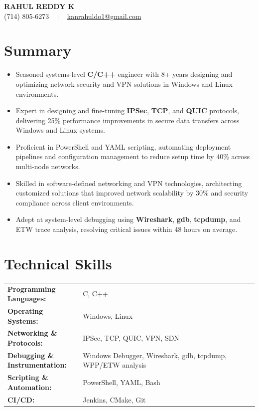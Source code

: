 \documentclass[letterpaper,11pt]{article}
\newcommand{\resumeItem}[1]{
  \item\footnotesize{
    {#1 \vspace{-2pt}}
  }
}
\newcommand{\resumeItemListStart}{\begin{itemize}[leftmargin=*]}
\newcommand{\resumeItemListEnd}{\end{itemize}\vspace{-5pt}}
\begin{document}
\begin{center}
    {\fontsize{14pt}{12pt}\selectfont \textbf{\MakeUppercase{Rahul Reddy K}}}\\ \vspace{2pt}
    \fontsize{10pt}{12pt}\selectfont (714) 805-6273 ~ | ~ \href{mailto:kanrahuldo1@gmail.com}{kanrahuldo1@gmail.com}~
    \vspace{-8pt}
\end{center}

\section{Summary}
\fontsize{9pt}{10pt}\selectfont
\resumeItemListStart
    \resumeItem{Seasoned systems-level \textbf{C/C++} engineer with 8+ years designing and optimizing network security and VPN solutions in Windows and Linux environments.}
    \resumeItem{Expert in designing and fine-tuning \textbf{IPSec}, \textbf{TCP}, and \textbf{QUIC} protocols, delivering 25\% performance improvements in secure data transfers across Windows and Linux systems.}
    \resumeItem{Proficient in PowerShell and YAML scripting, automating deployment pipelines and configuration management to reduce setup time by 40\% across multi-node networks.}
    \resumeItem{Skilled in software-defined networking and VPN technologies, architecting customized solutions that improved network scalability by 30\% and security compliance across client environments.}
    \resumeItem{Adept at system-level debugging using \textbf{Wireshark}, \textbf{gdb}, \textbf{tcpdump}, and ETW trace analysis, resolving critical issues within 48 hours on average.}
\resumeItemListEnd
\vspace{-6pt}

\section{Technical Skills}
        \vspace{-14pt}
        \begin{table}[h]
            \fontsize{9pt}{10pt}\selectfont
            \begin{tabular}{p{0.3\linewidth} p{0.7\linewidth}}
                \textbf{Programming Languages:} & C, C++ \\
                \textbf{Operating Systems:} & Windows, Linux \\
                \textbf{Networking \& Protocols:} & IPSec, TCP, QUIC, VPN, SDN \\
                \textbf{Debugging \& Instrumentation:} & Windows Debugger, Wireshark, gdb, tcpdump, WPP/ETW analysis \\
                \textbf{Scripting \& Automation:} & PowerShell, YAML, Bash \\
                \textbf{CI/CD:} & Jenkins, CMake, Git \\
            \end{tabular}
        \end{table}
    \vspace{-15pt}
\end{document}
